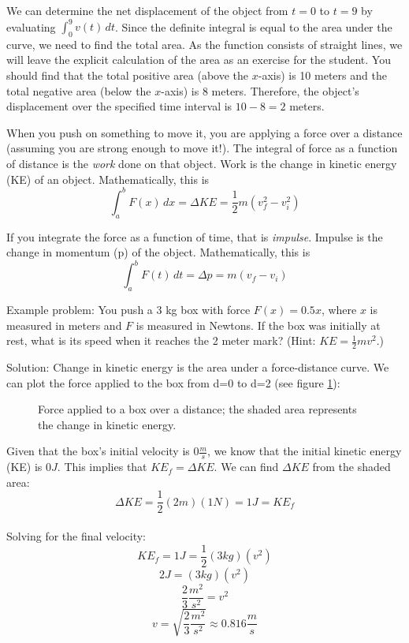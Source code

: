 We can determine the net displacement of the object from $t = 0$ to 
$t = 9$ by evaluating $\int_{0}^{9} v(t)\, dt$. Since the definite 
integral is equal to the area under the curve, we need to find the 
total area. As the function consists of straight lines, we will leave 
the explicit calculation of the area as an exercise for the student. 
You should find that the total positive area (above the $x$-axis) is 
10 meters and the total negative area (below the $x$-axis) is 8 meters. 
Therefore, the object's displacement over the specified time interval 
is $10 - 8 = 2$ meters. 

When you push on something to move it, you are applying a force over 
a distance (assuming you are strong enough to move it!). The integral 
of force as a function of distance is the \textit{work} done on that 
object.  Work is the change in kinetic energy (KE) of an object. 
Mathematically, this is $$\int_{a}^{b} F(x)\,dx = \Delta KE = 
\frac{1}{2} m (v_f^2 - v_i^2)$$

If you integrate the force as a function of time, that is 
\textit{impulse}. Impulse is the change in momentum (p) of the 
object. Mathematically, this is $$\int_{a}^{b} F(t)\,dt = \Delta p 
= m (v_f - v_i)$$

Example problem: You push a 3 kg box with force $F(x) = 0.5x$, where 
$x$ is measured in meters and $F$ is measured in Newtons. If the box 
was initially at rest, what is its speed when it reaches the 2 meter 
mark? (Hint: $KE = \frac{1}{2} m v^2$.) 

Solution: Change in kinetic energy is the area under a force-distance 
curve. We can plot the force applied to the box from d=0 to d=2 (see 
figure \ref{fig:KEbox}):

\begin{figure}[htbp]
 \caption{Force applied to a box over a distance; the shaded area 
 represents the change in kinetic energy.}
 \label{fig:KEbox}
\end{figure}

Given that the box's initial velocity is $0 \frac{m}{s}$, we know that 
the initial kinetic energy (KE) is $0J$. This implies that $KE_f = 
\Delta KE$. We can find $\Delta KE$ from the shaded area:\\
$$\Delta KE = \frac{1}{2} (2m) (1N) = 1 J = KE_f$$\\
Solving for the final velocity:\\
$$KE_f = 1 J = \frac{1}{2}(3kg)(v^2)$$
$$2 J = (3 kg) (v^2)$$
$$\frac{2}{3} \frac{m^2}{s^2} = v^2$$
$$v=\sqrt{\frac{2}{3} \frac{m^2}{s^2}} \approx 0.816 \frac{m}{s}$$


